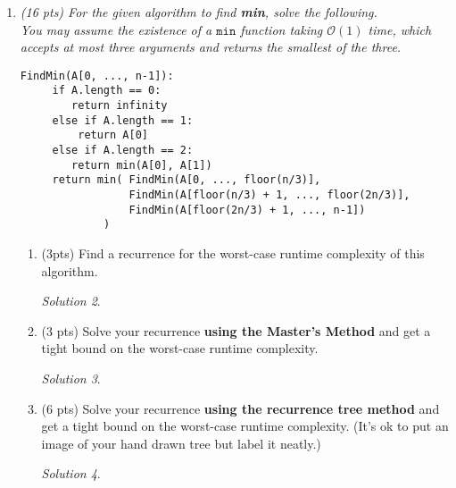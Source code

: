 \documentclass[12pt]{article}
\theoremstyle{remark}
\newtheorem*{solution}{Solution}
\newcommand{\makenonemptybox}[2]{%
\item[]
\fbox{%
\parbox[c][#1][t]{\dimexpr\linewidth-2\fboxsep-2\fboxrule}{
  \hrule width \hsize height 0pt
  #2
 }%
}%
\par\vspace{\ht\strutbox}
}
\begin{document}
\begin{enumerate}
{\noindent Find a recurrence for the worst-case runtime complexity of this algorithm. Then \textbf{solve} your recurrence and get a tight bound on the worst-case runtime complexity.}
\begin{verbatim}
CountParens(A[0, ..., 2n-1]):
    if A.length == 0:
        return 0
    return 1 + CountParens(A[1, ..., 2n-2])
\end{verbatim}
\begin{solution}
\end{solution}

\pagebreak
\item{\itshape (16 pts) For the given algorithm to find \textbf{min}, solve the following. \\

\noindent You may assume the existence of a $\texttt{min}$ function taking $\mathcal{O}(1)$ time, which accepts at most three arguments and returns the smallest of the three.}
\begin{verbatim}
FindMin(A[0, ..., n-1]):
     if A.length == 0:
        return infinity
     else if A.length == 1:
         return A[0]
     else if A.length == 2:
        return min(A[0], A[1]) 
     return min( FindMin(A[0, ..., floor(n/3)], 
                 FindMin(A[floor(n/3) + 1, ..., floor(2n/3)],
                 FindMin(A[floor(2n/3) + 1, ..., n-1])
             )
\end{verbatim}
\begin{enumerate}[label=(\alph*)]
\item (3pts) Find a recurrence for the worst-case runtime complexity of this algorithm.
\begin{solution}
\end{solution}
\pagebreak

\item (3 pts) Solve your recurrence \textbf{using the Master's Method} and get a tight bound on the worst-case runtime complexity.
\begin{solution}
\end{solution}
\pagebreak

\item (6 pts) Solve your recurrence \textbf{using the recurrence tree method} and get a tight bound on the worst-case runtime complexity. (It's ok to put an image of your hand drawn tree but label it neatly.)
\begin{solution}
\end{solution}
\pagebreak


\end{enumerate}
\end{enumerate}
\end{document}
